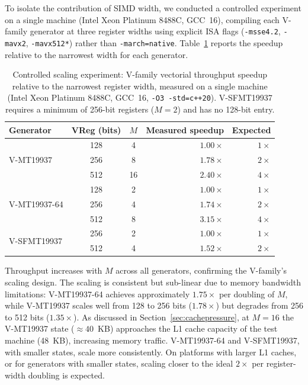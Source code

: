 \documentclass[preprint,1p,times]{elsarticle}
\begin{document}
To isolate the contribution of SIMD width, we conducted a controlled experiment on a single machine (Intel Xeon Platinum 8488C, GCC~16), compiling each V-family generator at three register widths using explicit ISA flags (\texttt{-msse4.2}, \texttt{-mavx2}, \texttt{-mavx512*}) rather than \texttt{-march=native}. Table~\ref{table:scaling} reports the speedup relative to the narrowest width for each generator.

\begin{table}[H]
	\centering
	\small
	\begin{tabular}{|l|c|c|r|r|}
		\hline
		\textbf{Generator} & \textbf{VReg (bits)} & \textbf{$M$} & \textbf{Measured speedup} & \textbf{Expected} \\
		\hline
		\multirow{3}{*}{V-MT19937}    & 128 &  4 & $1.00\times$ & $1\times$ \\
		                              & 256 &  8 & $1.78\times$ & $2\times$ \\
		                              & 512 & 16 & $2.40\times$ & $4\times$ \\
		\hline
		\multirow{3}{*}{V-MT19937-64} & 128 &  2 & $1.00\times$ & $1\times$ \\
		                              & 256 &  4 & $1.74\times$ & $2\times$ \\
		                              & 512 &  8 & $3.15\times$ & $4\times$ \\
		\hline
		\multirow{2}{*}{V-SFMT19937}  & 256 &  2 & $1.00\times$ & $1\times$ \\
		                              & 512 &  4 & $1.52\times$ & $2\times$ \\
		\hline
	\end{tabular}
	\caption{\label{table:scaling} Controlled scaling experiment: V-family vectorial throughput speedup relative to the narrowest register width, measured on a single machine (Intel Xeon Platinum 8488C, GCC~16, \texttt{-O3 -std=c++20}). V-SFMT19937 requires a minimum of 256-bit registers ($M=2$) and has no 128-bit entry.}
\end{table}

Throughput increases with $M$ across all generators, confirming the V-family's scaling design. The scaling is consistent but sub-linear due to memory bandwidth limitations: V-MT19937-64 achieves approximately $1.75\times$ per doubling of $M$, while V-MT19937 scales well from 128 to 256 bits ($1.78\times$) but degrades from 256 to 512 bits ($1.35\times$). As discussed in Section~\ref{sec:cachepressure}, at $M=16$ the V-MT19937 state ($\approx40$~KB) approaches the L1 cache capacity of the test machine (48~KB), increasing memory traffic. V-MT19937-64 and V-SFMT19937, with smaller states, scale more consistently. On platforms with larger L1 caches, or for generators with smaller states, scaling closer to the ideal $2\times$ per register-width doubling is expected.
\end{document}
